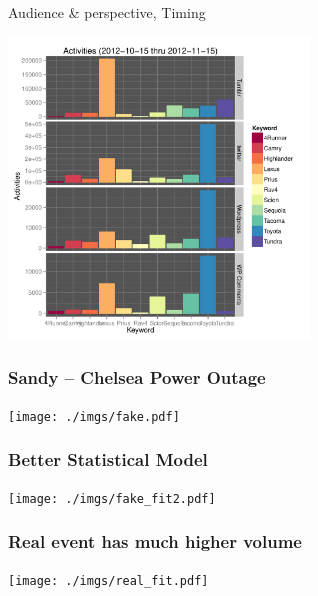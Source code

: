\documentclass{beamer}
\begin{document}

\begin{frame}
\begin{center}
{\Huge Audience \& perspective, Timing}
\end{center}
\end{frame}

\begin{frame}
  \begin{center}
    \includegraphics[width=8cm]{./imgs/bars.pdf}
  \end{center}
\end{frame}


\begin{frame}
\begin{center}
\end{center}
\end{frame}


\begin{frame}\frametitle{Sandy -- Chelsea Power Outage}
  \begin{center}
    \texttt{[image: ./imgs/fake.pdf]}
  \end{center}
\end{frame}


\begin{frame}\frametitle{Better Statistical Model}
  \begin{center}
    \texttt{[image: ./imgs/fake\_fit2.pdf]}
  \end{center}
\end{frame}

\begin{frame}\frametitle{Real event has much higher volume}
  \begin{center}
    \texttt{[image: ./imgs/real\_fit.pdf]}
  \end{center}
\end{frame}
\end{document}
